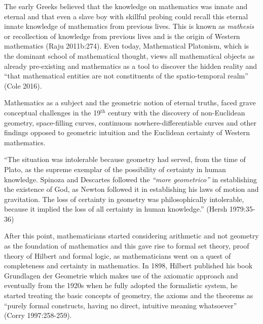 The early Greeks believed that the knowledge on mathematics was innate and eternal and that even a slave boy with skillful probing could recall this eternal innate knowledge of mathematics from previous lives. This is known as {\sl mathesis} or recollection of knowledge from previous lives and is the origin of Western mathematics (Raju 2011b:274). Even today, Mathematical Platonism, which is the dominant school of mathematical thought, views all mathematical objects as already pre-existing and mathematics as a tool to discover the hidden reality and “that mathematical entities are not constituents of the spatio-temporal realm” (Cole 2016). 

Mathematics as a subject and the geometric notion of eternal truths, faced grave conceptual challenges in the 19$^{\text{th}}$ century with the discovery of non-Euclidean geometry, space-filling curves, continuous nowhere-differentiable curves and other findings opposed to geometric intuition and the Euclidean certainty of Western mathematics.
\begin{myquote}
``The situation was intolerable because geometry had served, from the time of Plato, as the supreme exemplar of the possibility of certainty in human knowledge. Spinoza and Descartes followed the {\sl``more geometrico''} in establishing the existence of God, as Newton followed it in establishing his laws of motion and gravitation. The loss of certainty in geometry was philosophically intolerable, because it implied the loss of all certainty in human knowledge.''	
\hfill (Hersh 1979:35-36)
\end{myquote}

After this point, mathematicians started considering arithmetic and not geometry as the foundation of mathematics and this gave rise to formal set theory, proof theory of Hilbert and formal logic, as mathematicians went on a quest of completeness and certainty in mathematics. In 1898, Hilbert published his book Grundlagen der Geometrie which makes use of the axiomatic approach and eventually from the 1920s when he fully adopted the formalistic system, he started treating the basic concepts of geometry, the axioms and the theorems as “purely formal constructs, having no direct, intuitive meaning whatsoever” (Corry 1997:258-259).

